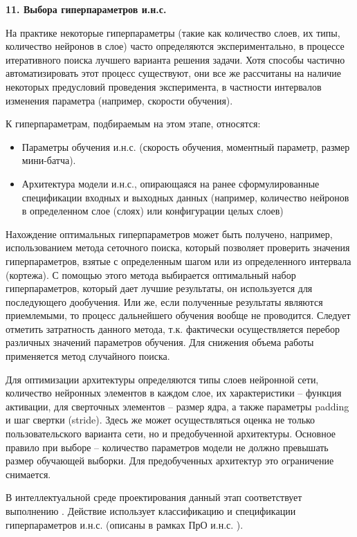 \textbf{11. Выбора гиперпараметров и.н.с.}

На практике некоторые гиперпараметры (такие как количество слоев, их типы, количество нейронов в слое) часто определяются экспериментально, в процессе итеративного поиска лучшего варианта решения задачи. Хотя способы частично автоматизировать этот процесс существуют, они все же рассчитаны на наличие некоторых предусловий проведения эксперимента, в частности интервалов изменения параметра (например, скорости обучения).

К гиперпараметрам, подбираемым на этом этапе, относятся:
\begin{itemize}
	\item Параметры обучения и.н.с. (скорость обучения, моментный параметр, размер мини-батча).
	\item Архитектура модели и.н.с., опирающаяся на ранее сформулированные спецификации входных и выходных данных (например, количество нейронов в определенном слое (слоях) или конфигурации целых слоев)
\end{itemize}

Нахождение оптимальных гиперпараметров может быть получено, например, использованием метода сеточного поиска, который позволяет проверить значения гиперпараметров, взятые с определенным шагом или из определенного интервала (кортежа). С помощью этого метода выбирается оптимальный набор гиперпараметров, который дает лучшие результаты, он используется для последующего дообучения. Или же, если полученные результаты являются приемлемыми, то процесс дальнейшего обучения вообще не проводится. Следует отметить затратность данного метода, т.к. фактически осуществляется перебор различных значений параметров обучения. Для снижения объема работы применяется метод случайного поиска.

Для оптимизации архитектуры определяются типы слоев нейронной сети, количество нейронных элементов в каждом слое, их характеристики -- функция активации, для сверточных элементов -- размер ядра, а также параметры padding и шаг свертки (stride).
Здесь же может осуществляться оценка не только пользовательского варианта сети, но и предобученной архитектуры. Основное правило при выборе -- количество параметров модели не должно превышать размер обучающей выборки. Для предобученных архитектур это ограничение снимается.

В интеллектуальной среде проектирования данный этап соответствует выполнению . Действие использует классификацию и спецификации гиперпараметров и.н.с. (описаны в рамках ПрО и.н.с. ).



